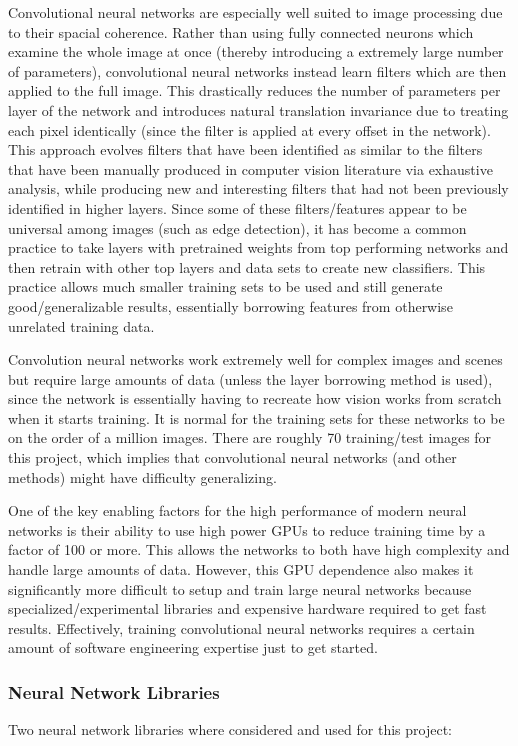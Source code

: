 \documentclass[12pt]{article}
\begin{document}
	Convolutional neural networks are especially well suited to image processing due to their spacial coherence.  Rather than using fully connected neurons which examine the whole image at once (thereby introducing a extremely large number of parameters), convolutional neural networks instead learn filters which are then applied to the full image.  This drastically reduces the number of parameters  per layer of the network and introduces natural translation invariance due to treating each pixel identically (since the filter is applied at every offset in the network).  This approach evolves filters that have been identified as similar to the filters that have been manually produced in computer vision literature via exhaustive analysis, while producing new and interesting filters that had not been previously identified in higher layers.  Since some of these filters/features appear to be universal among images (such as edge detection), it has become a common practice to take layers with pretrained weights from top performing networks and then retrain with other top layers and data sets to create new classifiers.  This practice allows much smaller training sets to be used and still generate good/generalizable results, essentially borrowing features from otherwise unrelated training data.

	Convolution neural networks work extremely well for complex images and scenes but require large amounts of data (unless the layer borrowing method is used), since the network is essentially having to recreate how vision works from scratch when it starts training.  It is normal for the training sets for these networks to be on the order of a million images.  There are roughly 70 training/test images for this project, which implies that convolutional neural networks (and other methods) might have difficulty generalizing.

	One of the key enabling factors for the high performance of modern neural networks is their ability to use high power GPUs to reduce training time by a factor of 100 or more.  This allows the networks to both have high complexity and handle large amounts of data.  However, this GPU dependence also makes it significantly more difficult to setup and train large neural networks because specialized/experimental libraries and expensive hardware required to get fast results.  Effectively, training convolutional neural networks requires a certain amount of software engineering expertise just to get started.

\subsubsection{Neural Network Libraries}
	Two neural network libraries where considered and used for this project:  
\end{document}
